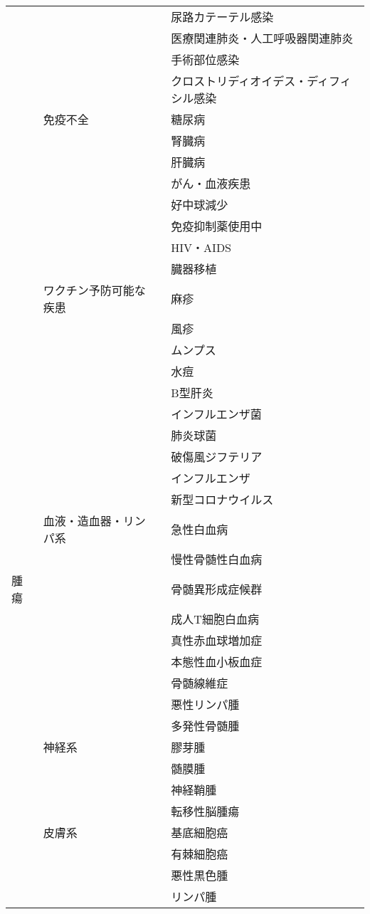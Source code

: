 \begin{xltabular}{\linewidth}{XXXX}
 &  &  & 尿路カテーテル感染 \\
 &  &  & 医療関連肺炎・人工呼吸器関連肺炎 \\
 &  &  & 手術部位感染 \\
 &  &  & クロストリディオイデス・ディフィシル感染 \\
 & 免疫不全 &  & 糖尿病 \\
 &  &  & 腎臓病 \\
 &  &  & 肝臓病 \\
 &  &  & がん・血液疾患 \\
 &  &  & 好中球減少 \\
 &  &  & 免疫抑制薬使用中 \\
 &  &  & HIV・AIDS \\
 &  &  & 臓器移植 \\
 & ワクチン予防可能な疾患 &  & 麻疹 \\
 &  &  & 風疹 \\
 &  &  & ムンプス \\
 &  &  & 水痘 \\
 &  &  & B型肝炎 \\
 &  &  & インフルエンザ菌 \\
 &  &  & 肺炎球菌 \\
 &  &  & 破傷風ジフテリア \\
 &  &  & インフルエンザ \\
 &  &  & 新型コロナウイルス \\
 & 血液・造血器・リンパ系 &  & 急性白血病 \\
 &  &  & 慢性骨髄性白血病 \\
腫瘍 &  &  & 骨髄異形成症候群 \\
 &  &  & 成人T細胞白血病 \\
 &  &  & 真性赤血球増加症 \\
 &  &  & 本態性血小板血症 \\
 &  &  & 骨髄線維症 \\
 &  &  & 悪性リンパ腫 \\
 &  &  & 多発性骨髄腫 \\
 & 神経系 &  & 膠芽腫 \\
 &  &  & 髄膜腫 \\
 &  &  & 神経鞘腫 \\
 &  &  & 転移性脳腫瘍 \\
 & 皮膚系 &  & 基底細胞癌 \\
 &  &  & 有棘細胞癌 \\
 &  &  & 悪性黒色腫 \\
 &  &  & リンパ腫 \\

\end{xltabular}
